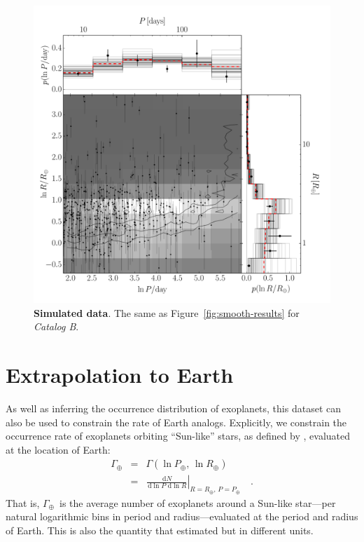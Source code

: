 \documentclass[12pt,preprint]{aastex}
\newcommand{\figref}[1]{\ref{fig:#1}}
\newcommand{\Fig}[1]{Figure~\figref{#1}}
\newcommand{\fig}[1]{\Fig{#1}}
\newcommand{\figlabel}[1]{\label{fig:#1}}
\newcommand{\eqlabel}[1]{\label{eq:#1}}
\newcommand{\sectlabel}[1]{\label{sect:#1}}
\newcommand{\dd}{\ensuremath{\,\mathrm{d}}}
\newcommand{\rate}{\ensuremath{\Gamma}}
\newcommand{\radius}{\ensuremath{R}}
\newcommand{\period}{\ensuremath{P}}
\newcommand{\modelb}{\emph{Catalog B}}
\newcommand{\gammaearth}{{\ensuremath{\rate_\oplus}}}
\begin{document}
\begin{figure}[p]
\begin{center}
\includegraphics[width=\textwidth]{figures/simulation/results.pdf}
\end{center}
\caption{%
{\bf Simulated data}.
The same as \fig{smooth-results} for \modelb.
\figlabel{simulation-results}}
\end{figure}

\section{Extrapolation to Earth}
\sectlabel{extrap}

As well as inferring the occurrence distribution of exoplanets, this dataset
can also be used to constrain the rate of Earth analogs.
Explicitly, we constrain the occurrence rate of exoplanets orbiting
``Sun-like'' stars, as defined by \citet{petigura}, evaluated at the location
of Earth:
\begin{eqnarray}\eqlabel{gammaearth}
\gammaearth &=& \rate (\ln\period_\oplus,\,\ln\radius_\oplus) \\
&=&
\left.\frac{\dd N}{\dd\ln\period\,\dd\ln\radius}\right|
_{\radius=\radius_\oplus,\,\period=\period_\oplus}\quad.
\end{eqnarray}
That is, \gammaearth\ is the average number of exoplanets around a
Sun-like star---per natural logarithmic bins in period and radius---evaluated
at the period and radius of Earth.
This is also the quantity that \citet{petigura} estimated but in different
units.
\end{document}

